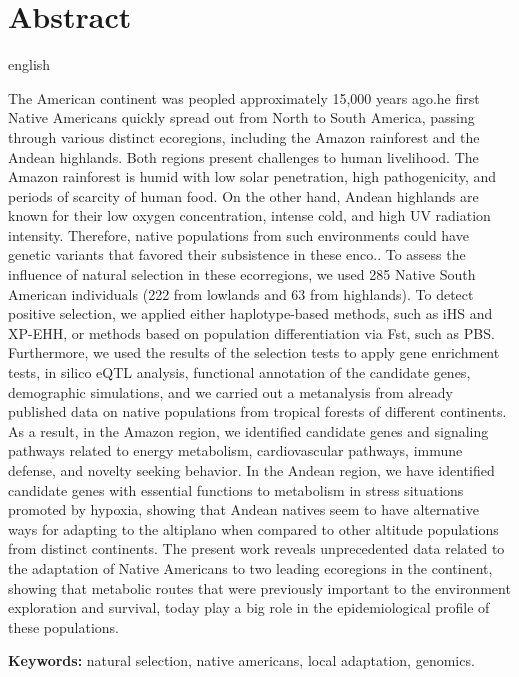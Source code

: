\documentclass[12pt,openright,twoside,a4paper,sumario=tradicional,english,brazil]{abntex2}
\renewcommand\chaptitlefont{\Large\scshape\centering}
\begin{document}
\chapter[ABSTRACT]{Abstract}
 
\begin{otherlanguage*}{english}

 The American continent was peopled approximately 15,000 years ago.he first Native Americans quickly spread out from North to South America, passing through various distinct ecoregions, including the Amazon rainforest and the Andean highlands. Both regions present challenges to human livelihood. The Amazon rainforest is humid with low solar penetration, high pathogenicity, and periods of scarcity of human food. On the other hand, Andean highlands are known for their low oxygen concentration, intense cold, and high UV radiation intensity. Therefore, native populations from such environments could have genetic variants that favored their subsistence in these enco.. To assess the influence of natural selection in these ecorregions, we used 285 Native South American individuals (222 from lowlands and 63 from highlands). To detect positive selection, we applied either haplotype-based methods, such as iHS and XP-EHH, or methods based on population differentiation via Fst, such as PBS. Furthermore, we used the results of the selection tests to apply gene enrichment tests, in silico eQTL analysis, functional annotation of the candidate genes, demographic simulations, and we carried out a metanalysis from already published data on native populations from tropical forests of different continents. As a result, in the Amazon region, we identified candidate genes and signaling pathways related to energy metabolism, cardiovascular pathways, immune defense, and novelty seeking behavior. In the Andean region, we have identified candidate genes with essential functions to metabolism in stress situations promoted by hypoxia, showing that Andean natives seem to have alternative ways for adapting to the altiplano when compared to other altitude populations from distinct continents. The present work reveals unprecedented data related to the adaptation of Native Americans to two leading ecoregions in the continent, showing that metabolic routes that were previously important to the environment exploration and survival, today play a big role in the epidemiological profile of these populations.

\vspace{\onelineskip}
\vspace{\onelineskip}

 \noindent \textbf{Keywords:} natural selection, native americans, local adaptation, genomics.
 \end{otherlanguage*}


\begingroup
\renewcommand\chaptitlefont{\LARGE\bfseries}

\endgroup
\end{document}
